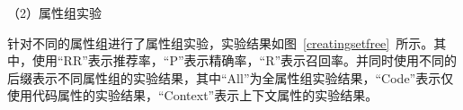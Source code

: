 
（2）属性组实验

针对不同的属性组进行了属性组实验，实验结果如图~\ref{creatingsetfree}~所示。其中，使用“RR”表示推荐率，“P”表示精确率，“R”表示召回率。并同时使用不同的后缀表示不同属性组的实验结果，其中“All”为全属性组实验结果，“Code”表示仅使用代码属性的实验结果，“Context”表示上下文属性的实验结果。

